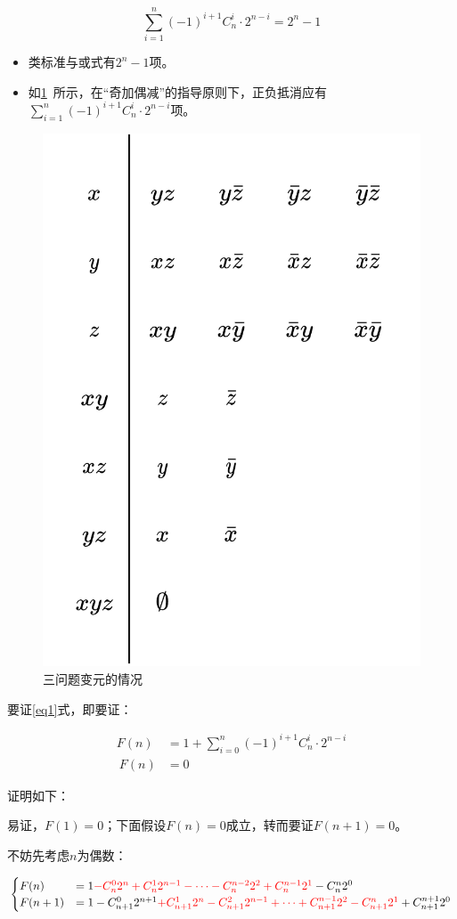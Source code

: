 \documentclass[12pt]{ctexart}
\begin{document}
\begin{equation}\label{eq1}
\sum_{i=1}^{n} (-1)^{i+1} C_{n}^{i} \cdot 2^{n-i} = 2^{n} - 1
\end{equation}

\begin{itemize}
    \item 类标准与或式有$2^{n} - 1$项。
    \item 如\cref{img:001}~所示，在“奇加偶减”的指导原则下，正负抵消应有$\sum_{i=1}^{n} (-1)^{i+1} C_{n}^{i} \cdot 2^{n-i}$项。
\end{itemize}

\begin{figure}[htbp]
    \centering
    \includegraphics[width=0.35\linewidth]{assets/4-1.png}
    \caption{三问题变元的情况}
    \label{img:001}
\end{figure}

要证\eqref{eq1}式，即要证：

\begin{align}
    F(n) &= 1 + \sum_{i=0}^{n} (-1)^{i+1} C_{n}^{i} \cdot 2^{n-i} \\~ F(n) &= 0 
\end{align}

证明如下：

易证，$F(1)=0$；下面假设$F(n)=0$成立，转而要证$F(n+1)=0$。

\newpage
不妨先考虑$n$为偶数：

\begin{equation}
\begin{cases}
 F(n) &= 1 \textcolor{red}{- C_n^0 2^n + C_n^1 2^{n-1} - \cdots - C_n^{n-2} 2^{2} + C_n^{n-1} 2^{1}} - C_n^{n} 2^{0}\\
 F(n+1) &= 1 - C_{n+1}^0 2^{n+1} \textcolor{red}{+ C_{n+1}^1 2^{n} - C_{n+1}^2 2^{n-1} + \cdots + C_{n+1}^{n-1} 2^{2} - C_{n+1}^{n} 2^{1}} + C_{n+1}^{n+1} 2^{0}
\end{cases}
\end{equation}
\end{document}
